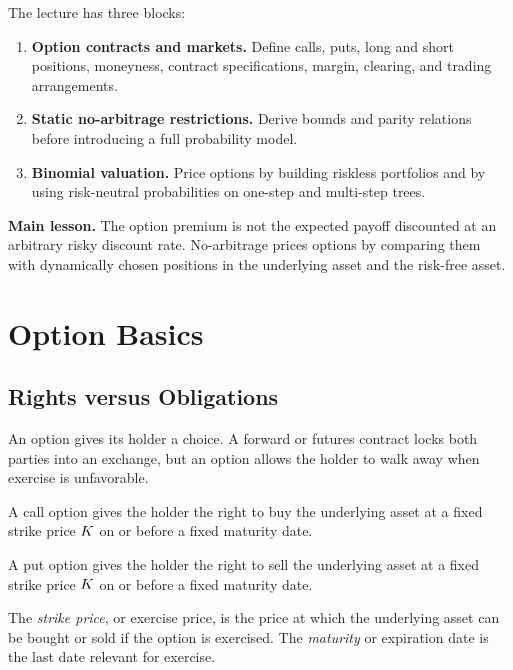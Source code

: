 The lecture has three blocks:
\begin{enumerate}
    \item \textbf{Option contracts and markets.} Define calls, puts, long and
    short positions, moneyness, contract specifications, margin, clearing, and
    trading arrangements.
    \item \textbf{Static no-arbitrage restrictions.} Derive bounds and parity
    relations before introducing a full probability model.
    \item \textbf{Binomial valuation.} Price options by building riskless
    portfolios and by using risk-neutral probabilities on one-step and
    multi-step trees.
\end{enumerate}

\begin{boxF}
\textbf{Main lesson.} The option premium is not the expected payoff discounted
at an arbitrary risky discount rate. No-arbitrage prices options by comparing
them with dynamically chosen positions in the underlying asset and the risk-free
asset.
\end{boxF}

\section{Option Basics}

\subsection{Rights versus Obligations}

An option gives its holder a choice. A forward or futures contract locks both
parties into an exchange, but an option allows the holder to walk away when
exercise is unfavorable.

\begin{defN}
A call option gives the holder the right to buy the underlying asset at a fixed
strike price $K$ on or before a fixed maturity date.
\end{defN}

\begin{defN}
A put option gives the holder the right to sell the underlying asset at a fixed
strike price $K$ on or before a fixed maturity date.
\end{defN}

\begin{defN}
The \emph{strike price}, or exercise price, is the price at which the underlying
asset can be bought or sold if the option is exercised. The \emph{maturity} or
expiration date is the last date relevant for exercise.
\end{defN}

